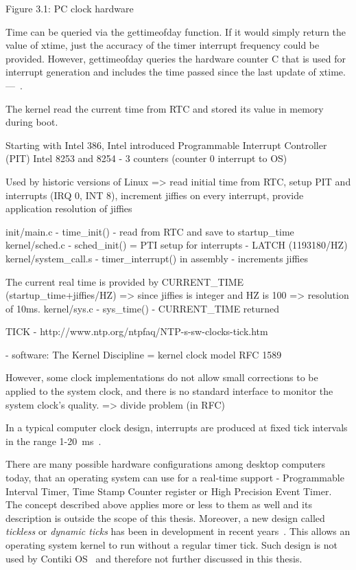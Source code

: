 Figure 3.1: PC clock hardware

Time can be queried via the gettimeofday function.
If it would simply return the value of xtime,
just the accuracy of the timer interrupt frequency could be provided.
However, gettimeofday queries the hardware counter C that is used for
interrupt generation and includes the time passed since the last update of xtime.
---~\cite{thesis-beat}.

The kernel read the current time from RTC and stored its value in memory during boot.

Starting with Intel 386, Intel introduced
Programmable Interrupt Controller (PIT) Intel 8253 and 8254 - 3 counters (counter 0 interrupt to OS)

Used by historic versions of Linux
=> read initial time from RTC, setup PIT and interrupts (IRQ 0, INT 8), increment jiffies on every interrupt, provide application resolution of jiffies

init/main.c - time\_init() - read from RTC and save to startup\_time
kernel/sched.c - sched\_init() = PTI setup for interrupts - LATCH (1193180/HZ)
kernel/system\_call.s - timer\_interrupt() in assembly - increments jiffies

The current real time is provided by CURRENT\_TIME (startup\_time+jiffies/HZ) => since jiffies is integer and HZ is 100 => resolution of 10ms.
kernel/sys.c - sys\_time() - CURRENT\_TIME returned

TICK - http://www.ntp.org/ntpfaq/NTP-s-sw-clocks-tick.htm


- software:
The Kernel Discipline =  kernel clock model RFC 1589

However, some clock implementations do not allow small corrections to be applied to the system clock, and there is no standard interface to monitor the system clock's quality.
=> divide problem (in RFC)

In a typical computer clock design, interrupts are produced at
fixed tick intervals in the range 1-20~ms~\cite{nanokernel}.

There are many possible hardware configurations among desktop computers today,
that an operating system can use for a real-time support -
Programmable Interval Timer,
Time Stamp Counter register or High Precision Event Timer.
The concept described above applies more or less to them as well
and its description is outside the scope of this thesis.
Moreover, a new design called {\it{tickless}} or {\it{dynamic ticks}}
has been in development in recent years~\cite{kernel-timer-systems}.
This allows an operating system kernel to run without a regular timer tick.
Such design is not used by Contiki OS~\cite{contiki-docs} and
therefore not further discussed in this thesis.

